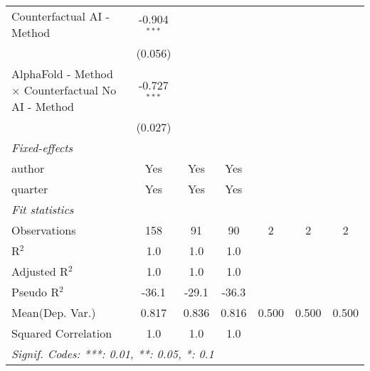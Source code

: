 \begin{tabular}{lcccccc}
   Counterfactual AI - Method                                 & -0.904$^{***}$ &                &                &     &     &   \\   
                                                              & (0.056)        &                &                &     &     &   \\   
   AlphaFold - Method $\times$ Counterfactual No AI - Method  & -0.727$^{***}$ &                &                &     &     &   \\   
                                                              & (0.027)        &                &                &     &     &   \\   
   \midrule
   \emph{Fixed-effects}\\
   author                                                     & Yes            & Yes            & Yes            &     &     & \\  
   quarter                                                    & Yes            & Yes            & Yes            &     &     & \\  
   \midrule
   \emph{Fit statistics}\\
   Observations                                               & 158            & 91             & 90             & 2   & 2   & 2\\  
   R$^2$                                                      & 1.0            & 1.0            & 1.0            &     &     & \\  
   Adjusted R$^2$                                             & 1.0            & 1.0            & 1.0            &     &     & \\  
   Pseudo R$^2$                                               & -36.1          & -29.1          & -36.3          &     &     & \\  
Mean(Dep. Var.) & 0.817 & 0.836 & 0.816 & 0.500 & 0.500 & 0.500 \\
   Squared Correlation                                        & 1.0            & 1.0            & 1.0            &     &     & \\  
   \midrule \midrule
   \multicolumn{7}{l}{\emph{Signif. Codes: ***: 0.01, **: 0.05, *: 0.1}}\\
\end{tabular}
\par\endgroup
